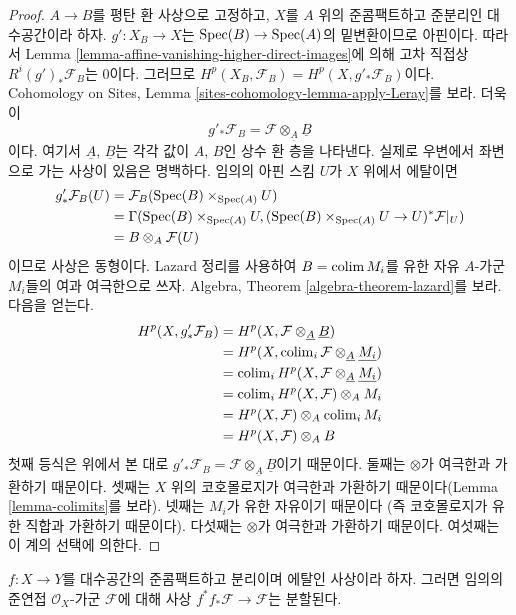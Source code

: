 \begin{proof}
\medskip\noindent
$A \to B$를 평탄 환 사상으로 고정하고, $X$를 $A$ 위의
준콤팩트하고 준분리인 대수공간이라 하자.
$g' : X_B \to X$는 $\mathop{\mathrm{Spec}}(B) \to \mathop{\mathrm{Spec}}(A)$의 밑변환이므로 아핀이다.
따라서 Lemma \ref{lemma-affine-vanishing-higher-direct-images}에 의해
고차 직접상 $R^i(g')_*\mathcal{F}_B$는 0이다. 그러므로
$H^p(X_B, \mathcal{F}_B) = H^p(X, g'_*\mathcal{F}_B)$이다.
Cohomology on Sites, Lemma \ref{sites-cohomology-lemma-apply-Leray}를 보라.
더욱이
$$
g'_*\mathcal{F}_B = \mathcal{F} \otimes_{\underline{A}} \underline{B}
$$
이다. 여기서 $\underline{A}$, $\underline{B}$는 각각 값이 $A$, $B$인
상수 환 층을 나타낸다. 실제로 우변에서 좌변으로 가는 사상이 있음은
명백하다. 임의의 아핀 스킴 $U$가 $X$ 위에서 에탈이면
\begin{align*}
g'_*\mathcal{F}_B(U) & = \mathcal{F}_B(\mathop{\mathrm{Spec}}(B) \times_{\mathop{\mathrm{Spec}}(A)} U) \\
& =
\Gamma(\mathop{\mathrm{Spec}}(B) \times_{\mathop{\mathrm{Spec}}(A)} U,
(\mathop{\mathrm{Spec}}(B) \times_{\mathop{\mathrm{Spec}}(A)} U \to U)^*\mathcal{F}|_U) \\
& =
B \otimes_A \mathcal{F}(U)
\end{align*}
이므로 사상은 동형이다. Lazard 정리를 사용하여 $B = \mathop{\mathrm{colim}}\nolimits M_i$를
유한 자유 $A$-가군 $M_i$들의 여과 여극한으로 쓰자. Algebra, Theorem
\ref{algebra-theorem-lazard}를 보라. 다음을 얻는다.
\begin{align*}
H^p(X, g'_*\mathcal{F}_B) &
= H^p(X, \mathcal{F} \otimes_{\underline{A}} \underline{B}) \\
& = H^p(X, \mathop{\mathrm{colim}}\nolimits_i \mathcal{F} \otimes_{\underline{A}} \underline{M_i}) \\
& = \mathop{\mathrm{colim}}\nolimits_i H^p(X, \mathcal{F} \otimes_{\underline{A}} \underline{M_i}) \\
& = \mathop{\mathrm{colim}}\nolimits_i H^p(X, \mathcal{F}) \otimes_A M_i \\
& = H^p(X, \mathcal{F}) \otimes_A \mathop{\mathrm{colim}}\nolimits_i M_i \\
& = H^p(X, \mathcal{F}) \otimes_A B
\end{align*}
첫째 등식은 위에서 본 대로
$g'_*\mathcal{F}_B = \mathcal{F} \otimes_{\underline{A}} \underline{B}$이기
때문이다. 둘째는 $\otimes$가 여극한과 가환하기 때문이다. 셋째는
$X$ 위의 코호몰로지가 여극한과 가환하기 때문이다(Lemma
\ref{lemma-colimits}를 보라). 넷째는 $M_i$가 유한 자유이기 때문이다
(즉 코호몰로지가 유한 직합과 가환하기 때문이다). 다섯째는
$\otimes$가 여극한과 가환하기 때문이다. 여섯째는 이 계의 선택에
의한다.
\end{proof}

\begin{lemma}
\label{lemma-etale-pull-push-split}
$f : X \to Y$를 대수공간의 준콤팩트하고 분리이며 에탈인 사상이라
하자. 그러면 임의의 준연접 $\mathcal{O}_X$-가군 $\mathcal{F}$에 대해
사상 $f^*f_*\mathcal{F} \to \mathcal{F}$는 분할된다.
\end{lemma}

